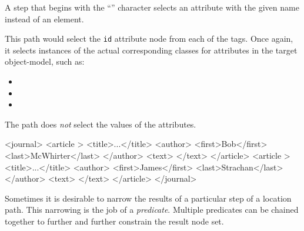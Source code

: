\documentclass[20pt,landscape,headrule,footrule]{foils}
\begin{document}
A step that begins with the ``\at'' character selects an attribute
with the given name instead of an element.



This path would select the \texttt{id} attribute node from 
each of the  tags.  Once again, it selects instances
of the actual corresponding classes for attributes in the
target object-model, such as:

\begin{itemize}
  \item {}
  \item {}
  \item {}
\end{itemize}

The path does \emph{not} select the values of the attributes.




\begin{codelisting}
<journal>
    <article >
        <title>...</title>
        <author>
          <first>Bob</first>
          <last>McWhirter</last>
        </author>
        <text>
        </text>
    </article>
    <article >
        <title>...</title>
        <author>
          <first>James</first>
          <last>Strachan</last>
        </author>
        <text>
        </text>
    </article>
</journal>
\end{codelisting}



Sometimes it is desirable to narrow the results of a particular
step of a location path.  This narrowing is the job of a
\emph{predicate}.  Multiple predicates can be chained together
to further and further constrain the result node set.
\end{document}
